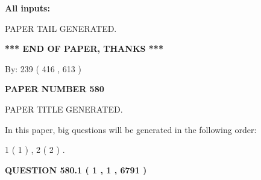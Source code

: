 \documentclass{ctexart}
\begin{document}
   
   
   
\noindent{}
   
   
   
   
\noindent\vspace{0.1in}\hspace{-0.08in} {\textbf{\Large{All inputs: }}}
   
   
   
   
   
   
 \vspace{0.2in}
 
   
   
\vspace{2.0in} PAPER TAIL GENERATED.
   
   
   
   
\vspace{1.0in} 
{\textbf{\large{ *** END OF PAPER, THANKS *** }}} 
   
   
\hspace{1.0in} By: 
 239 ( 416 ,  613 )
   
   
   
   
\newpage 
\setcounter{page}{ 
   580001 } 
   
   
   
   
 {\textbf{ \Large{ PAPER NUMBER  580  }}}
   
   
\vspace{0.2in}
   
   
   
   
   
   
   
   
 \vspace{0.2in}
 
 
 
 
   
   
 PAPER TITLE GENERATED.
   
   
   
\vspace{0.2in}
   
In this paper, big questions will be generated in the following order: 
   
   
   1 ( 1 )
 ,
   2 ( 2 )
 .
  
\vspace{0.2in}
  
{\textbf{\Large{QUESTION
580.1 
 ( 1 , 1 , 6791 )
}}}
  
\end{document}
